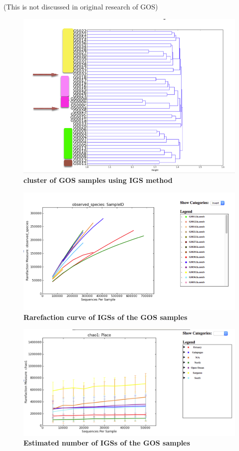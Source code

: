 (This is not discussed in original research of GOS)

\begin{figure}[!ht]
 \centerline{\includegraphics[width=7in]{./figures/GOS_cluster.png}}
\caption{\bf cluster of GOS samples using IGS method}
\label{fig:GOS-beta}
\end{figure}

\begin{figure}[!ht]
 \centerline{\includegraphics[width=7in]{./figures/GOS_observed.png}}
\caption{\bf Rarefaction curve of IGSs of the GOS samples}
\label{fig:GOS-rarefaction}
\end{figure}

\begin{figure}[!ht]
 \centerline{\includegraphics[width=7in]{./figures/GOS_chao.png}}
\caption{\bf Estimated number of IGSs of the GOS samples}
\label{fig:GOS-chao1}
\end{figure}


